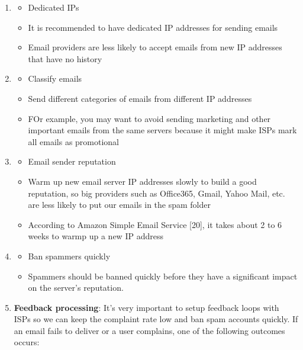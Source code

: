 \documentclass{report}
\theoremstyle{definition}
\begin{document}
\begin{enumerate}
\item

\begin{itemize}
\item
Dedicated IPs
\item
It is recommended to have dedicated IP addresses for sending emails
\item
Email providers are less likely to accept emails from new IP addresses that have no history
\end{itemize}

\item
\begin{itemize}
\item
Classify emails
\item
Send different categories of emails from different IP addresses
\item
FOr example, you may want to avoid sending marketing and other important emails from the same servers because it might make ISPs mark all emails as promotional
\end{itemize}

\item
\begin{itemize}
\item
Email sender reputation
\item
Warm up new email server IP addresses slowly to build a good reputation, so big providers such as Office365, Gmail, Yahoo Mail, etc. are less likely to put our emails in the spam folder
\item
According to Amazon Simple Email Service [20], it takes about 2 to 6 weeks to warmp up a new IP address
\end{itemize}
\item

\begin{itemize}
\item
Ban spammers quickly
\item
Spammers should be banned quickly before they have a significant impact on the server's reputation.
\end{itemize}

\item

\textbf{Feedback processing}: It's very important to setup feedback loops with ISPs so we can keep the complaint rate low and ban spam accounts quickly. If an email fails to deliver or a user complains, one of the following outcomes occurs:


\end{enumerate}
\end{document}

